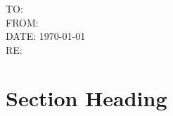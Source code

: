 \documentclass[12pt]{article}
\begin{document}
\noindent TO: \\
\noindent FROM: \\
\noindent DATE: \today\\
\noindent RE:

\lipsum[1]

\section{Section Heading}

\lipsum[2-3]
\end{document}
